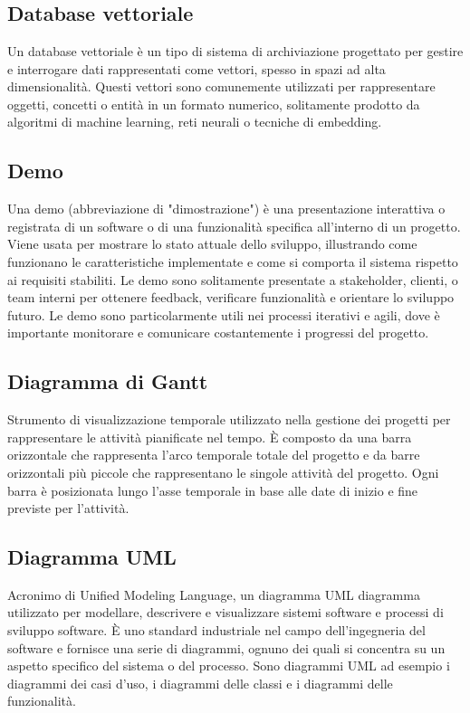 
\section{}

\hypertarget{sec:database_vettoriale}{}
\subsection*{Database vettoriale}
Un database vettoriale è un tipo di sistema di archiviazione progettato per gestire e interrogare dati rappresentati come vettori, spesso in spazi ad 
alta dimensionalità. Questi vettori sono comunemente utilizzati per rappresentare oggetti, concetti o entità in un formato numerico, solitamente prodotto 
da algoritmi di machine learning, reti neurali o tecniche di embedding.

\hypertarget{sec:demo}{}
\subsection*{Demo}
Una demo (abbreviazione di "dimostrazione") è una presentazione interattiva o registrata di un software o di una funzionalità specifica all'interno di un 
progetto. Viene usata per mostrare lo stato attuale dello sviluppo, illustrando come funzionano le caratteristiche implementate e come si comporta il 
sistema rispetto ai requisiti stabiliti. Le demo sono solitamente presentate a stakeholder, clienti, o team interni per ottenere feedback, verificare 
funzionalità e orientare lo sviluppo futuro. Le demo sono particolarmente utili nei processi iterativi e agili, dove è importante monitorare e comunicare 
costantemente i progressi del progetto.

\hypertarget{sec:diagramma_Gantt}{}
\subsection*{Diagramma di Gantt}
Strumento di visualizzazione temporale utilizzato nella gestione dei progetti per rappresentare le attività pianificate nel tempo. È composto da una barra 
orizzontale che rappresenta l’arco temporale totale del progetto e da barre orizzontali più piccole che rappresentano le singole attività del progetto. 
Ogni barra è posizionata lungo l’asse temporale in base alle date di inizio e fine previste per l’attività.

\hypertarget{sec:diagramma_UML}{}
\subsection*{Diagramma UML}
Acronimo di Unified Modeling Language, un diagramma UML diagramma utilizzato per modellare, descrivere e visualizzare sistemi software e processi di sviluppo 
software. È uno standard industriale nel campo dell’ingegneria del software e fornisce una serie di diagrammi, ognuno dei quali si concentra su un aspetto 
specifico del sistema o del processo. Sono diagrammi UML ad esempio i diagrammi dei casi d’uso, i diagrammi delle classi e i diagrammi delle funzionalità.

